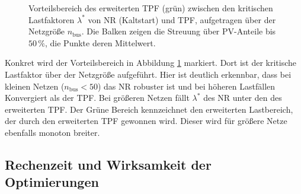 \begin{figure}[htbp]
	\centering
	
	\caption{Vorteilsbereich des erweiterten TPF (grün) zwischen den kritischen
	Lastfaktoren $\lambda^\ast$ von NR (Kaltstart) und TPF, aufgetragen über
	der Netzgröße $n_\mathrm{bus}$. Die Balken zeigen die Streuung über
	PV-Anteile bis $50\,\%$, die Punkte deren Mittelwert.}
	\label{fig:advantage_region_by_size}
\end{figure}


Konkret wird der Vorteilsbereich in Abbildung \ref{fig:advantage_region_by_size} markiert.
Dort ist der kritische Lastfaktor über der Netzgröße aufgeführt.
Hier ist deutlich erkennbar, dass bei kleinen Netzen ($n_\mathrm{bus}<50$) das NR robuster ist und bei höheren Lastfällen Konvergiert als der TPF. 
Bei größeren Netzen fällt $\lambda^*$ des NR unter den des erweiterten TPF. 
Der Grüne Bereich kennzeichnet den erweiterten Lastbereich, der durch den erweiterten TPF gewonnen wird.
Dieser wird für größere Netze ebenfalls monoton breiter.







%
%
%

\subsection{Rechenzeit und Wirksamkeit der Optimierungen}
\label{subsec:lam-time}

